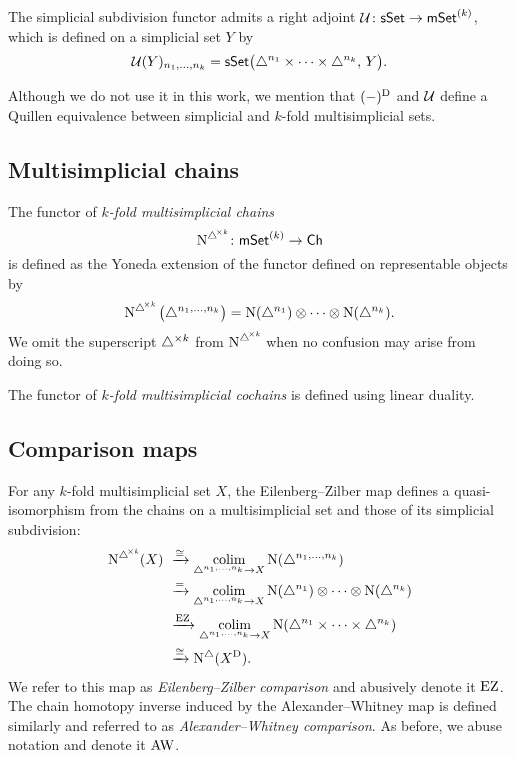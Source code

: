 The simplicial subdivision functor admits a right adjoint $\operatorname{\mathcal{U}} \colon \mathsf{sSet} \to \mathsf{mSet}^{(k)}$, which is defined on a simplicial set $Y$ by
\[
\operatorname{\mathcal{U}}(Y)_{n_1, \dots, n_k} =
\mathsf{sSet}\big( \triangle^{n_1} \times \dots \times \triangle^{n_k}, \, Y \big).
\]

\begin{remark}
	Although we do not use it in this work, we mention that $(-)^{\operatorname{D}}$ and $\operatorname{\mathcal{U}}$ define a Quillen equivalence between simplicial and $k$-fold multisimplicial sets.
\end{remark}

\subsection{Multisimplicial chains}

The functor of \textit{$k$-fold multisimplicial chains}
\[
\operatorname{\operatorname{N}^{\triangle^{\!\times\mathit{k}}}} \colon \mathsf{mSet}^{(k)} \to \mathsf{Ch}
\]
is defined as the Yoneda extension of the functor defined on representable objects by
\[
\operatorname{\operatorname{N}^{\triangle^{\!\times\mathit{k}}}} \big( \triangle^{n_1, \dots, n_k} \big) =
\operatorname{N}(\triangle^{n_1}) \otimes \dotsb \otimes \operatorname{N}(\triangle^{n_k}).
\]
We omit the superscript $\triangle^{\times k}$ from $\operatorname{\operatorname{N}^{\triangle^{\!\times\mathit{k}}}}$ when no confusion may arise from doing so.

The functor of \textit{$k$-fold multisimplicial cochains} is defined using linear duality.

\subsection{Comparison maps}

For any $k$-fold multisimplicial set $X$, the Eilenberg--Zilber map defines a quasi-isomorphism from the chains on a multisimplicial set and those of its simplicial subdivision:
\begin{equation} \label{e:ez comparison}
\begin{split}
\operatorname{\operatorname{N}^{\triangle^{\!\times\mathit{k}}}}(X) \ &\xrightarrow{\cong}
\operatorname*{colim}_{\triangle^{n_1, \dots, n_k} \to X} \operatorname{N} (\triangle^{n_1, \dots, n_k}) \\ &\xrightarrow{=}
\operatorname*{colim}_{\triangle^{n_1, \dots, n_k} \to X} \operatorname{N}(\triangle^{n_1}) \otimes \dotsb \otimes \operatorname{N}(\triangle^{n_k}) \\ &\xrightarrow{\operatorname{EZ}}
\operatorname*{colim}_{\triangle^{n_1, \dots, n_k} \to X} \operatorname{N}(\triangle^{n_1} \times \dots \times \triangle^{n_k}) \\ &\xrightarrow{\cong}
\operatorname{N^{\triangle}}(X^{\operatorname{D}}).
\end{split}
\end{equation}
We refer to this map as \textit{Eilenberg--Zilber comparison} and abusively denote it $\operatorname{EZ}$.
The chain homotopy inverse induced by the Alexander--Whitney map is defined similarly and referred to as \textit{Alexander--Whitney comparison}.
As before, we abuse notation and denote it $\operatorname{AW}$.

